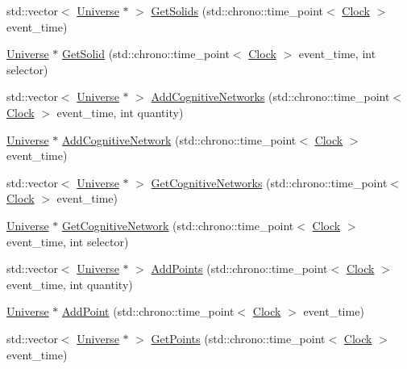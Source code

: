 \begin{DoxyCompactItemize}
\item 
std\+::vector$<$ \hyperlink{class_universe}{Universe} $\ast$ $>$ \hyperlink{class_universe_a669fc068dd7820a5af309bfbe67199aa}{Get\+Solids} (std\+::chrono\+::time\+\_\+point$<$ \hyperlink{universe_8h_a0ef8d951d1ca5ab3cfaf7ab4c7a6fd80}{Clock} $>$ event\+\_\+time)
\item 
\hyperlink{class_universe}{Universe} $\ast$ \hyperlink{class_universe_a9f7b74fc21d45ddaa78aa18e9a337bcd}{Get\+Solid} (std\+::chrono\+::time\+\_\+point$<$ \hyperlink{universe_8h_a0ef8d951d1ca5ab3cfaf7ab4c7a6fd80}{Clock} $>$ event\+\_\+time, int selector)
\item 
std\+::vector$<$ \hyperlink{class_universe}{Universe} $\ast$ $>$ \hyperlink{class_universe_a5199f6c27b1a97c8b8c9847b8be686cf}{Add\+Cognitive\+Networks} (std\+::chrono\+::time\+\_\+point$<$ \hyperlink{universe_8h_a0ef8d951d1ca5ab3cfaf7ab4c7a6fd80}{Clock} $>$ event\+\_\+time, int quantity)
\item 
\hyperlink{class_universe}{Universe} $\ast$ \hyperlink{class_universe_ab682307c963836cd81b35b5604bd7064}{Add\+Cognitive\+Network} (std\+::chrono\+::time\+\_\+point$<$ \hyperlink{universe_8h_a0ef8d951d1ca5ab3cfaf7ab4c7a6fd80}{Clock} $>$ event\+\_\+time)
\item 
std\+::vector$<$ \hyperlink{class_universe}{Universe} $\ast$ $>$ \hyperlink{class_universe_a06968a24194280a43f077c5b77379ea8}{Get\+Cognitive\+Networks} (std\+::chrono\+::time\+\_\+point$<$ \hyperlink{universe_8h_a0ef8d951d1ca5ab3cfaf7ab4c7a6fd80}{Clock} $>$ event\+\_\+time)
\item 
\hyperlink{class_universe}{Universe} $\ast$ \hyperlink{class_universe_a1ea2b7e438bfdc7dd599aa59c310b126}{Get\+Cognitive\+Network} (std\+::chrono\+::time\+\_\+point$<$ \hyperlink{universe_8h_a0ef8d951d1ca5ab3cfaf7ab4c7a6fd80}{Clock} $>$ event\+\_\+time, int selector)
\item 
std\+::vector$<$ \hyperlink{class_universe}{Universe} $\ast$ $>$ \hyperlink{class_universe_aa48ced2078ba863723050d8283b3fa67}{Add\+Points} (std\+::chrono\+::time\+\_\+point$<$ \hyperlink{universe_8h_a0ef8d951d1ca5ab3cfaf7ab4c7a6fd80}{Clock} $>$ event\+\_\+time, int quantity)
\item 
\hyperlink{class_universe}{Universe} $\ast$ \hyperlink{class_universe_a8508b791c6997d8abcdcc037a6776734}{Add\+Point} (std\+::chrono\+::time\+\_\+point$<$ \hyperlink{universe_8h_a0ef8d951d1ca5ab3cfaf7ab4c7a6fd80}{Clock} $>$ event\+\_\+time)
\item 
std\+::vector$<$ \hyperlink{class_universe}{Universe} $\ast$ $>$ \hyperlink{class_universe_a765c6c658b7a465cd92418690db846ae}{Get\+Points} (std\+::chrono\+::time\+\_\+point$<$ \hyperlink{universe_8h_a0ef8d951d1ca5ab3cfaf7ab4c7a6fd80}{Clock} $>$ event\+\_\+time)

\end{DoxyCompactItemize}
